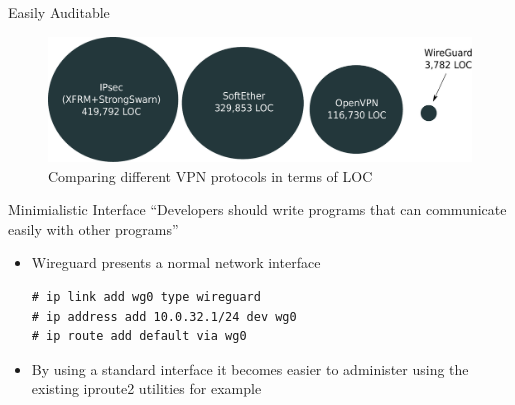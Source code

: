 \documentclass{beamer}
\begin{document}
    \begin{frame}{Easily Auditable}
        \begin{figure}
            \includegraphics[width=\textwidth]{vpn_compare.pdf}
            \caption{Comparing different VPN protocols in terms of LOC}
        \end{figure}
    \end{frame}
    \begin{frame}[fragile]{Minimialistic Interface}
    ``Developers should write programs that can communicate easily with other programs''
    \\[5pt]
        \begin{itemize}
            \item Wireguard presents a normal network interface
                \begin{lstlisting}
# ip link add wg0 type wireguard
# ip address add 10.0.32.1/24 dev wg0
# ip route add default via wg0
                \end{lstlisting}
            \item By using a standard interface it becomes easier to administer using the existing iproute2 utilities for example
        \end{itemize}
    \end{frame}
\end{document}
